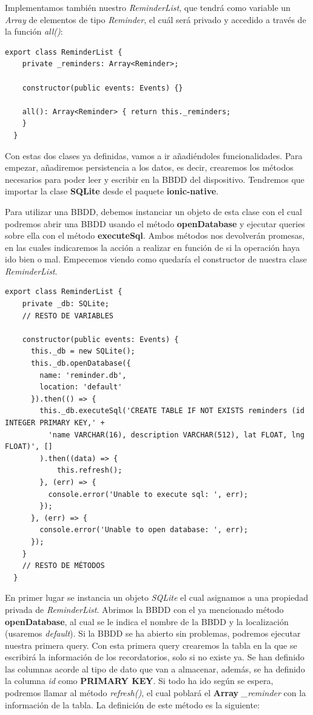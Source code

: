 Implementamos también nuestro \emph{ReminderList}, que tendrá como variable un \emph{Array} de elementos de tipo \emph{Reminder}, el cuál será privado y accedido a través de la función \emph{all()}:

\begin{lstlisting}[style=htmlcssjs,frame=tlrb,xleftmargin={0.2cm}]
  export class ReminderList {
    private _reminders: Array<Reminder>;

    constructor(public events: Events) {}

    all(): Array<Reminder> { return this._reminders;
    }
  }
\end{lstlisting}

Con estas dos clases ya definidas, vamos a ir añadiéndoles funcionalidades. Para empezar, añadiremos persistencia a los datos, es decir, crearemos los métodos necesarios para poder leer y escribir en la \gls{BBDD} del dispositivo. Tendremos que importar la clase \textbf{SQLite} desde el paquete \textbf{ionic-native}.

Para utilizar una \gls{BBDD}, debemos instanciar un objeto de esta clase con el cual podremos abrir una \gls{BBDD} usando el método \textbf{openDatabase} y ejecutar queries sobre ella con el método \textbf{executeSql}. Ambos métodos nos devolverán promesas, en las cuales indicaremos la acción a realizar en función de si la operación haya ido bien o mal. Empecemos viendo como quedaría el constructor de nuestra clase \emph{ReminderList}.

\begin{lstlisting}[style=htmlcssjs,frame=tlrb,xleftmargin={0.2cm}]
  export class ReminderList {
    private _db: SQLite;
    // RESTO DE VARIABLES

    constructor(public events: Events) {
      this._db = new SQLite();
      this._db.openDatabase({
        name: 'reminder.db',
        location: 'default'
      }).then(() => {
        this._db.executeSql('CREATE TABLE IF NOT EXISTS reminders (id INTEGER PRIMARY KEY,' +
          'name VARCHAR(16), description VARCHAR(512), lat FLOAT, lng FLOAT)', []
        ).then((data) => {
            this.refresh();
        }, (err) => {
          console.error('Unable to execute sql: ', err);
        });
      }, (err) => {
        console.error('Unable to open database: ', err);
      });
    }
    // RESTO DE MÉTODOS
  }
\end{lstlisting}

En primer lugar se instancia un objeto \emph{SQLite} el cual asignamos a una propiedad privada de \emph{ReminderList}. Abrimos la \gls{BBDD} con el ya mencionado método \textbf{openDatabase}, al cual se le indica el nombre de la \gls{BBDD} y la localización (usaremos \emph{default}). Si la \gls{BBDD} se ha abierto sin problemas, podremos ejecutar nuestra primera query. Con esta primera query crearemos la tabla en la que se escribirá la información de los recordatorios, solo si no existe ya. Se han definido las columnas acorde al tipo de dato que van a almacenar, además, se ha definido la columna \emph{id} como \textbf{PRIMARY KEY}. Si todo ha ido según se espera, podremos llamar al método \emph{refresh()}, el cual poblará el \textbf{Array} \emph{\_reminder} con la información de la tabla. La definición de este método es la siguiente:

